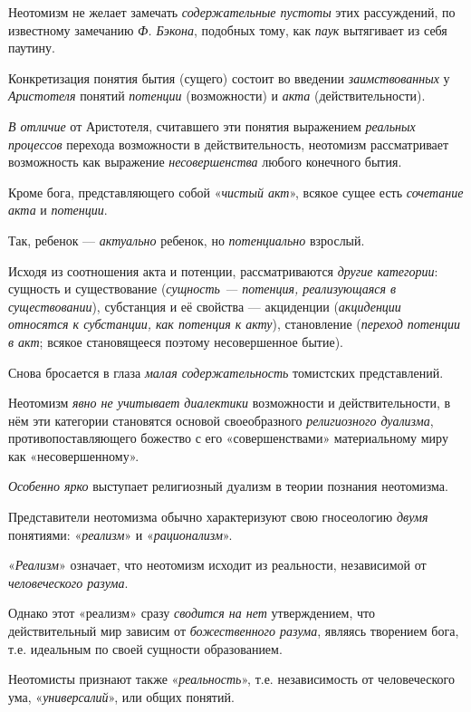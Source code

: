 \documentclass[a4paper,14pt,russian]{extreport}
\begin{document}
Неотомизм не желает замечать \emph{содержательные пустоты} этих рассуждений, по известному замечанию \emph{Ф. Бэкона}, подобных тому, как \emph{паук} вытягивает из себя паутину.

Конкретизация понятия бытия (сущего) состоит во введении \emph{заимствованных} у \emph{Аристотеля} понятий \emph{потенции} (возможности) и \emph{акта} (действительности).

\emph{В отличие} от Аристотеля, считавшего эти понятия выражением \emph{реальных процессов} перехода возможности в действительность, неотомизм рассматривает возможность как выражение \emph{несовершенства} любого конечного бытия.

Кроме бога, представляющего собой «\emph{чистый акт}», всякое сущее есть \emph{сочетание акта} и \emph{потенции}.

Так, ребенок --- \emph{актуально} ребенок, но \emph{потенциально} взрослый.

Исходя из соотношения акта и потенции, рассматриваются \emph{другие категории}: сущность и существование (\emph{сущность --- потенция, реализующаяся в существовании}), субстанция и её свойства --- акциденции (\emph{акциденции относятся к субстанции, как потенция к акту}), становление (\emph{переход потенции в акт}; всякое становящееся поэтому несовершенное бытие).

Снова бросается в глаза \emph{малая содержательность} томистских представлений.

Неотомизм \emph{явно не учитывает диалектики} возможности и действительности, в нём эти категории становятся основой своеобразного \emph{религиозного дуализма}, противопоставляющего божество с его «совершенствами» материальному миру как «несовершенному».

\emph{Особенно ярко} выступает религиозный дуализм в теории познания неотомизма.

Представители неотомизма обычно характеризуют свою гносеологию \emph{двумя} понятиями: «\emph{реализм}» и «\emph{рационализм}».

«\emph{Реализм}» означает, что неотомизм исходит из реальности, независимой от \emph{человеческого разума}.

Однако этот «реализм» сразу \emph{сводится на нет} утверждением, что действительный мир зависим от \emph{божественного разума}, являясь творением бога, т.е. идеальным по своей сущности образованием.

Неотомисты признают также «\emph{реальность}», т.е. независимость от человеческого ума, «\emph{универсалий}», или общих понятий.
\end{document}

